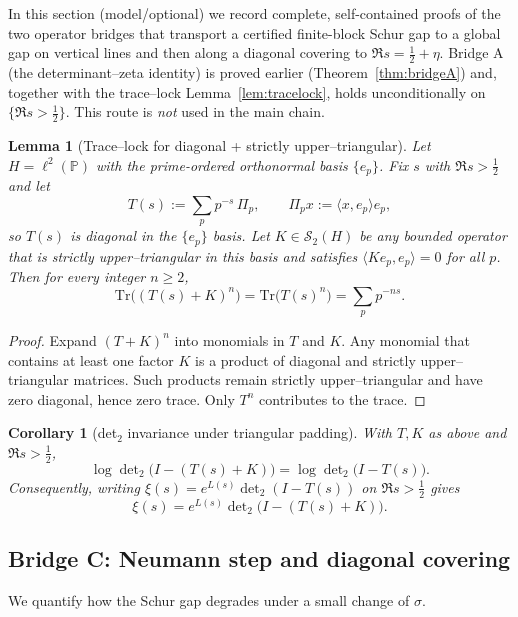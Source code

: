 \documentclass[11pt]{article}
\newtheorem{lemma}[theorem]{Lemma}
\newtheorem{corollary}[theorem]{Corollary}
\theoremstyle{definition}
\theoremstyle{remark}
\begin{document}
In this section (model/optional) we record complete, self-contained proofs of the two operator bridges that transport a certified finite-block Schur gap to a global gap on vertical lines and then along a diagonal covering to $\Re s=\tfrac12+\eta$. Bridge A (the determinant--zeta identity) is proved earlier (Theorem~\ref{thm:bridgeA}) and, together with the trace--lock Lemma~\ref{lem:tracelock}, holds unconditionally on $\{\Re s>\tfrac12\}$. This route is \emph{not} used in the main chain.
\begin{lemma}[Trace–lock for diagonal + strictly upper–triangular]\label{lem:trace-lock}
Let $H=\ell^2(\mathbb{P})$ with the prime-ordered orthonormal basis $\{e_p\}$. Fix $s$ with $\Re s> \tfrac12$ and let 
\[
T(s):=\sum_{p} p^{-s}\,\Pi_p,\qquad \Pi_p x:=\langle x,e_p\rangle e_p,
\]
so $T(s)$ is diagonal in the $\{e_p\}$ basis. Let $K\in \mathcal S_2(H)$ be any bounded operator that is strictly upper--triangular in this basis and satisfies $\langle Ke_p,e_p\rangle=0$ for all $p$. Then for every integer $n\ge 2$,
\[
\mathrm{Tr}\big((T(s)+K)^n\big)=\mathrm{Tr}\big(T(s)^n\big)=\sum_{p} p^{-ns}.
\]
\end{lemma}

\begin{proof}
Expand $(T+K)^n$ into monomials in $T$ and $K$. Any monomial that contains at least one factor $K$ is a product of diagonal and strictly upper--triangular matrices. Such products remain strictly upper--triangular and have zero diagonal, hence zero trace. Only $T^n$ contributes to the trace.
\end{proof}

\begin{corollary}[det$_2$ invariance under triangular padding]\label{cor:det2-invariance}
With $T, K$ as above and $\Re s>\tfrac12$,
\[
\log\det\nolimits_2\!\big(I-(T(s)+K)\big) = \log\det\nolimits_2\!\big(I-T(s)\big).
\]
Consequently, writing $\xi(s)=e^{L(s)}\det\nolimits_2(I-T(s))$ on $\Re s>\tfrac12$ gives
\[
\xi(s)=e^{L(s)}\det\nolimits_2\!\big(I-(T(s)+K)\big).
\]
\end{corollary}

\subsection*{Bridge C: Neumann step and diagonal covering}

We quantify how the Schur gap degrades under a small change of $\sigma$.
\end{document}
